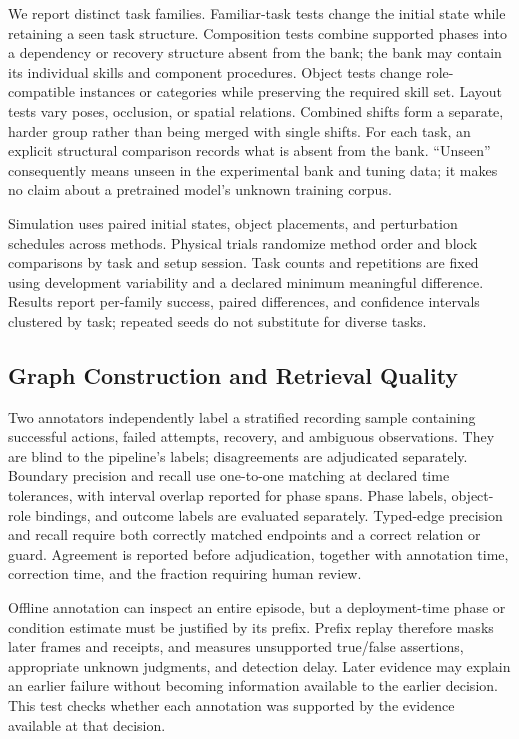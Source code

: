 \documentclass[10pt,twocolumn,letterpaper]{article}
\begin{document}
We report distinct task families. Familiar-task tests change the initial state while retaining a seen task structure. Composition tests combine supported phases into a dependency or recovery structure absent from the bank; the bank may contain its individual skills and component procedures. Object tests change role-compatible instances or categories while preserving the required skill set. Layout tests vary poses, occlusion, or spatial relations. Combined shifts form a separate, harder group rather than being merged with single shifts. For each task, an explicit structural comparison records what is absent from the bank. ``Unseen'' consequently means unseen in the experimental bank and tuning data; it makes no claim about a pretrained model's unknown training corpus.

Simulation uses paired initial states, object placements, and perturbation schedules across methods. Physical trials randomize method order and block comparisons by task and setup session. Task counts and repetitions are fixed using development variability and a declared minimum meaningful difference. Results report per-family success, paired differences, and confidence intervals clustered by task; repeated seeds do not substitute for diverse tasks.

\subsection{Graph Construction and Retrieval Quality}

Two annotators independently label a stratified recording sample containing successful actions, failed attempts, recovery, and ambiguous observations. They are blind to the pipeline's labels; disagreements are adjudicated separately. Boundary precision and recall use one-to-one matching at declared time tolerances, with interval overlap reported for phase spans. Phase labels, object-role bindings, and outcome labels are evaluated separately. Typed-edge precision and recall require both correctly matched endpoints and a correct relation or guard. Agreement is reported before adjudication, together with annotation time, correction time, and the fraction requiring human review.

Offline annotation can inspect an entire episode, but a deployment-time phase or condition estimate must be justified by its prefix. Prefix replay therefore masks later frames and receipts, and measures unsupported true/false assertions, appropriate unknown judgments, and detection delay. Later evidence may explain an earlier failure without becoming information available to the earlier decision. This test checks whether each annotation was supported by the evidence available at that decision.
\end{document}
